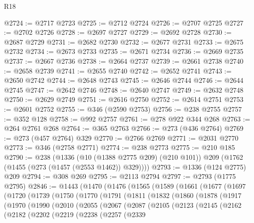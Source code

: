 \begin{lexlean}{R18}
\begin{coremodule}
{{{{{{{{{{{{{{{{{{{{{{{{{{{{{{{{{{{{{{{{{{{{{{{{{{{{{{{{{{{{{{{{{{{{{{{{{{{{{{{{{{{{{{{{{{{{{{{{{{{{{{{{{{{{{{{{{{{{{{{{{{{{{{{{{{{{{{{{{{{{{{{@2724 := @2717 @2723
@2725 := @2712 @2724
@2726 := @2707 @2725
@2727 := @2702 @2726
@2728 := @2697 @2727
@2729 := @2692 @2728
@2730 := @2687 @2729
@2731 := @2682 @2730
@2732 := @2677 @2731
@2733 := @2675 @2732
@2734 := @2673 @2733
@2735 := @2671 @2734
@2736 := @2669 @2735
@2737 := @2667 @2736
@2738 := @2664 @2737
@2739 := @2661 @2738
@2740 := @2658 @2739
@2741 := @2655 @2740
@2742 := @2652 @2741
@2743 := @2650 @2742
@2744 := @2648 @2743
@2745 := @2646 @2744
@2746 := @2644 @2745
@2747 := @2642 @2746
@2748 := @2640 @2747
@2749 := @2632 @2748
@2750 := @2629 @2749
@2751 := @2616 @2750
@2752 := @2614 @2751
@2753 := @2601 @2752
@2755 := @346 (@2590 @2753)
@2756 := @238 @2755
@2757 := @352 @128
@2758 := @992 @2757
@2761 := @278 @922 @344 @268
@2763 := @264 @2761 @268
@2764 := @365 @2763
@2766 := @273 (@436 @2764)
@2769 := @273 (@457 @2764) @329
@2770 := @2766 @2769
@2771 := @2031 @2770
@2773 := @346 (@2758 @2771)
@2774 := @238 @2773
@2775 := @210 @185
@2790 := @238
    (@1336
      (@10 (@1388 @2775 @209) (@210 @101))
      @209
      (@1762 (@1455 (@273 (@1457 (@2553 @1462)) @329))))
@2793 := @1336 (@124 @2775) @209
@2794 := @308 @269
@2795 := @2113 @2794
@2797 := @2793 (@1775 @2795)
@2846 := @1443
    (@1470
      (@1476
        (@1565
          (@1589
            (@1661
              (@1677
                (@1697
                  (@1720
                    (@1739
                      (@1750
                        (@1770
                          (@1791
                            (@1811
                              (@1832
                                (@1860
                                  (@1878
                                    (@1917
                                      (@1970
                                        (@1990
                                          (@2010
                                            (@2055
                                              (@2067
                                                (@2087
                                                  (@2105
                                                    (@2123
                                                      (@2145
                                                        (@2162
                                                          (@2182
                                                            (@2202
                                                              (@2219
                                                                (@2238
                                                                  (@2257
                                                                    (@2339
}}}}}}}}}}}}}}}}}}}}}}}}}}}}}}}}}}}}}}}}}}}}}}}}}}}}}}}}}}}}}}}}}}}}}}}}}}}}}}}}}}}}}}}}}}}}}}}}}}}}}}}}}}}}}}}}}}}}}}}}}}}}}}}}}}}}}}}}}}}}}}}
\end{coremodule}
\end{lexlean}
